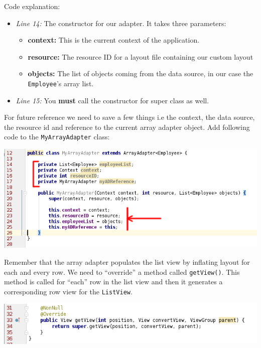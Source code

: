 Code explanation:

\begin{itemize}
	\item \textit{Line 14:} The constructor for our adapter. It takes three parameters:
		\begin{itemize}
			\item \textbf{context:} This is the current context of the application.
			\item \textbf{resource:} The resource ID for a layout file containing our custom layout
			\item \textbf{objects:} The list of objects coming from the data source, in our case the \texttt{Employee}'s array list.
		\end{itemize}
	
	\item \textit{Line 15:} You \textbf{must} call the constructor for super class as well.
\end{itemize}

For future reference we need to save a few things i.e the context, the data source, the resource id and reference to the current array adapter object. Add following code to the \texttt{MyArrayAdapter} class:

\begin{center}
	\includegraphics[scale=0.4]{chapters/ch10/images/42}
\end{center}

Remember that the array adapter populates the list view by inflating layout for each and every row. We need to ``override'' a method called \texttt{getView()}. This method is called for ``each'' row in the list view and then it generates a corresponding row view for the \texttt{ListView}. 

\begin{center}
	\includegraphics[scale=0.4]{chapters/ch10/images/43}
\end{center}

